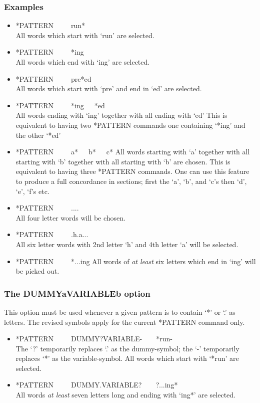\subsubsection{Examples}
\begin{itemize}
\item      *PATTERN~~~~~run*\\
All words which start with `run' are selected.
\item      *PATTERN~~~~~*ing\\
All words which end with `ing' are selected.
\item      *PATTERN~~~~~pre*ed\\
All words which start with `pre' and end in `ed' are selected.
\item      *PATTERN~~~~~*ing~~~*ed\\
All words ending with `ing' together with all ending with `ed'
This is equivalent to having two *PATTERN commands one containing
`*ing' and the other `*ed'
\item      *PATTERN~~~~~a*~~~b*~~~c*
All words starting with `a' together with all starting with `b'
together with all starting with `b' are chosen. This is equivalent to
having three *PATTERN commands.
One can use this feature to produce a full concordance in sections; first the
`a', `b', and `c's then `d', `e', `f's etc.
\item     *PATTERN~~~~~....\\
    All four letter words will be chosen.
\item     *PATTERN~~~~~.h.a...\\
    All six letter words with 2nd letter `h' and 4th letter `a' will
    be selected.
\item     *PATTERN~~~~~*...ing
    All words of {\em at least} six letters which end in `ing' will be
    picked out.
\end{itemize}

\subsubsection{The DUMMYaVARIABLEb option}
This option must be used whenever a given pattern is to contain `*' or
`.' as letters.  The revised symbols apply for the current *PATTERN command
only.

\begin{itemize}
\item   *PATTERN~~~~~DUMMY?VARIABLE-~~~~*run-\\
       The `?' temporarily replaces `.' as the dummy-symbol; the `-'
       temporarily replaces `*' as the variable-symbol.  All words which start
       with `*run' are selected.
\item   *PATTERN~~~~~DUMMY.VARIABLE?~~~~?...ing*\\
       All words {\em at least} seven letters long and ending with `ing*' are
       selected.
\end{itemize}

